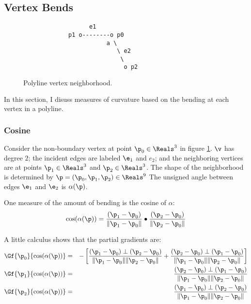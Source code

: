 \subsection{Vertex Bends}
\label{sec:Vertex-Bends}

\begin{figure}[!htp]
\centering
\begin{verbatim}
                   e1
             p1 o--------o p0
                        a \
                           \ e2
                            \
                             o p2
\end{verbatim}
\caption{Polyline vertex neighborhood.
\label{fig:Polyline-vertex-neighborhood}}
\end{figure}

In this section, I disuss measures of curvature
based on the bending at each vertex in a polyline.


\subsubsection{Cosine}
\label{sec:polyline-vertex-cosine}

Consider the non-boundary vertex
at point $\p_0 \in \Reals^3$ in figure \ref{fig:Polyline-vertex-neighborhood}.
$\v$ has degree $2$;
the incident edges are labeled $\e_1$ and $e_2$;
and the neighboring vertices are at points $\p_1 \in \Reals^3$
and $\p_2 \in \Reals^3$.
The shape of the neighborhood is determined by
$\p = (\p_0, \p_1, \p_2) \in \Reals^9$
The unsigned angle between edges $\e_1$ and $\e_2$ is $\alpha(\p)$.

One measure of the amount of bending is the cosine of $\alpha$:
\begin{equation}
\cos(\alpha(\p)) =
{{(\p_1 - \p_0)} \over {\| \p_1 - \p_0 \|} }
\bullet
{{(\p_2 - \p_0)} \over {\| \p_2 - \p_0 \|} }
\end{equation}

A little calculus shows that the partial gradients are:
\begin{eqnarray}
\label{eq:polyline-vertex-cosine-gradient}
\Gf{\p_0}{\cos(\alpha(\p))}
& = &
-
\left[
{{(\p_1 - \p_0) \perp  (\p_2 - \p_0)}
\over
{\| \p_1 - \p_0 \| \| \p_2 - \p_0 \|} }
+
{{(\p_2 - \p_0) \perp  (\p_1 - \p_0)}
\over
{\| \p_1 - \p_0 \| \| \p_2 - \p_0 \|} }
\right]
\\
\Gf{\p_1}{\cos(\alpha(\p))}
& = &
{{(\p_2 - \p_0) \perp  (\p_1 - \p_0)}
\over
{\| \p_1 - \p_0 \| \| \p_2 - \p_0 \|} }
\nonumber
\\
\Gf{\p_2}{\cos(\alpha(\p))}
& = &
{{(\p_1 - \p_0) \perp  (\p_2 - \p_0)}
\over
{\| \p_1 - \p_0 \| \| \p_2 - \p_0 \|} }
\nonumber
\end{eqnarray}

